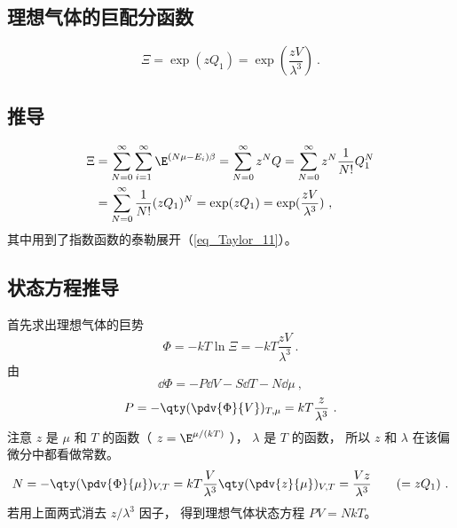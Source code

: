 
\begin{issues}
\issueDraft
\end{issues}

\subsection{理想气体的巨配分函数}
\begin{equation}\label{eq_IdMCE_1}
\Xi  = \exp(z Q_1) = \exp(\frac{zV}{\lambda^3})~.
\end{equation}
\subsection{推导}
\begin{equation}\label{eq_IdMCE_2}
\begin{aligned}
\Xi & = \sum_{N = 0}^\infty  \sum_{i = 1}^\infty  \E^{(N\mu - E_i)\beta}  = \sum_{N = 0}^\infty  z^N Q
 = \sum_{N = 0}^\infty  z^N \frac{1}{N!}Q_1^N \\
& = \sum_{N=0}^\infty  \frac{1}{N!} (z Q_1)^N
= \exp(z Q_1) = \exp(\frac{zV}{\lambda^3})~,
\end{aligned}
\end{equation}
其中用到了指数函数的泰勒展开（\autoref{eq_Taylor_11}）。

\subsection{状态方程推导}
首先求出理想气体的巨势
\begin{equation}\label{eq_IdMCE_4}
\Phi  =  - kT\ln \Xi  =  - kT\frac{zV}{\lambda ^3}~.
\end{equation}
由
\begin{equation}\label{eq_IdMCE_5}
\dd{\Phi} =  - P\dd{V} - S\dd{T} - N\dd{\mu}~,
\end{equation}
\begin{equation}\label{eq_IdMCE_6}
P = - \qty(\pdv{\Phi}{V})_{T, \mu} = kT\frac{z}{\lambda ^3}~.
\end{equation}
注意 $z$ 是 $\mu $ 和 $T$ 的函数（ $z = \E^{\mu/(kT)}$ ）， $\lambda $ 是 $T$ 的函数， 所以 $z$ 和 $\lambda $ 在该偏微分中都看做常数。
\begin{equation}\label{eq_IdMCE_7}
N = - \qty(\pdv{\Phi}{\mu})_{V,T} = kT\frac{V}{\lambda^3} \qty(\pdv{z}{\mu})_{V,T} = \frac{Vz}{\lambda ^3} 
\qquad ( = z{Q_1})~.
\end{equation}
若用上面两式消去 $z/\lambda^3$ 因子， 得到理想气体状态方程 $PV = NkT$。
  
